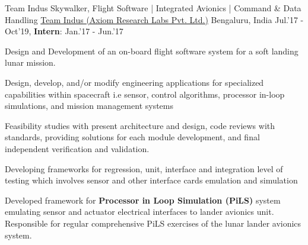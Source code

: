\begin{cventries}
	\cventry
	{Team Indus Skywalker, Flight Software | Integrated Avionics | Command \& Data Handling}
	{\href{http://www.teamindus.in/}{Team Indus (Axiom Research Labs Pvt. Ltd.)}}
	{Bengaluru, India}
	{Jul.'17 - Oct'19, \textbf{Intern}: Jan.'17 - Jun.'17}
	{
		\begin{cvitems}
			\item{Design and Development of an on-board flight software system for a soft landing lunar mission.}
			\item{Design, develop, and/or modify engineering applications for specialized capabilities within spacecraft i.e sensor, control algorithms, processor in-loop simulations, and mission management systems}
			\item{Feasibility studies with present architecture and design, code reviews with standards, providing solutions for each module development, and final independent verification and validation.}
			\item{Developing frameworks for regression, unit, interface and integration level of testing which involves sensor and other interface cards emulation and simulation}
			\item{Developed framework for \textbf{Processor in Loop Simulation (PiLS)} system emulating sensor and actuator electrical interfaces to lander avionics unit. Responsible for regular comprehensive PiLS exercises of the lunar lander avionics system.}
		\end{cvitems}
	}
\end{cventries}

